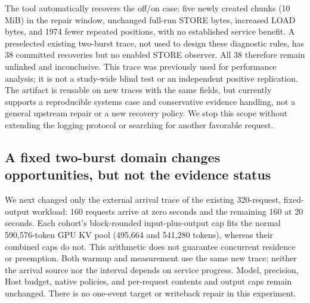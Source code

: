 \documentclass[10pt,a4paper]{article}
\begin{document}
The tool automatically recovers the off/on case: five newly created chunks
(10 MiB) in the repair window, unchanged full-run STORE bytes, increased
LOAD bytes, and 1974 fewer repeated positions, with no established service
benefit. A preselected existing two-burst trace, not used to design these
diagnostic rules, has 38 committed recoveries but no enabled STORE observer.
All 38 therefore remain unlinked and inconclusive. This trace was previously
used for performance analysis; it is not a study-wide blind test or an
independent positive replication. The artifact is reusable on new traces
with the same fields, but currently supports a reproducible systems case
and conservative evidence handling, not a general upstream repair or a new
recovery policy. We stop this scope without extending the logging protocol
or searching for another favorable request.

\subsection{A fixed two-burst domain changes opportunities, but not the evidence status}
We next changed only the external arrival trace of the existing 320-request,
fixed-output workload: 160 requests arrive at zero seconds and the remaining
160 at 20 seconds. Each cohort's block-rounded input-plus-output cap fits the
normal 590,576-token GPU KV pool (495,664 and 541,280 tokens), whereas their
combined caps do not. This arithmetic does not guarantee concurrent residence
or preemption. Both warmup and measurement use the same new trace; neither the
arrival source nor the interval depends on service progress. Model, precision,
Host budget, native policies, and per-request contents and output caps remain
unchanged. There is no one-event target or writeback repair in this experiment.
\end{document}
